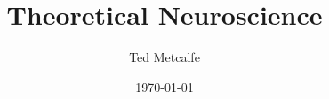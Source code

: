 



	\usepackage{fullpage}

	\usepackage{parskip}

	\usepackage[fleqn]{mathtools}

	\usepackage{subfiles}

	\usepackage{array}
	\usepackage{booktabs}

	\title{Theoretical Neuroscience}
	\author{Ted Metcalfe}
	\date{\today}

